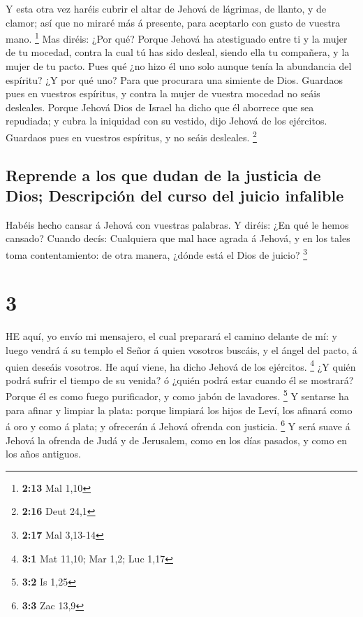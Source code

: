  Y esta otra vez haréis cubrir el altar de Jehová de
lágrimas, de llanto, y de clamor; así que no miraré más á presente, para
aceptarlo con gusto de vuestra mano. \footnote{\textbf{2:13} Mal 1,10}
 Mas diréis: ¿Por qué? Porque Jehová ha atestiguado entre
ti y la mujer de tu mocedad, contra la cual tú has sido desleal, siendo
ella tu compañera, y la mujer de tu pacto.  Pues qué ¿no
hizo él uno solo aunque tenía la abundancia del espíritu? ¿Y por qué
uno? Para que procurara una simiente de Dios. Guardaos pues en vuestros
espíritus, y contra la mujer de vuestra mocedad no seáis desleales.
 Porque Jehová Dios de Israel ha dicho que él aborrece que
sea repudiada; y cubra la iniquidad con su vestido, dijo Jehová de los
ejércitos. Guardaos pues en vuestros espíritus, y no seáis desleales.
\footnote{\textbf{2:16} Deut 24,1}

\hypertarget{reprende-a-los-que-dudan-de-la-justicia-de-dios-descripciuxf3n-del-curso-del-juicio-infalible}{%
\subsection{Reprende a los que dudan de la justicia de Dios; Descripción
del curso del juicio
infalible}\label{reprende-a-los-que-dudan-de-la-justicia-de-dios-descripciuxf3n-del-curso-del-juicio-infalible}}

 Habéis hecho cansar á Jehová con vuestras palabras. Y
diréis: ¿En qué le hemos cansado? Cuando decís: Cualquiera que mal hace
agrada á Jehová, y en los tales toma contentamiento: de otra manera,
¿dónde está el Dios de juicio? \footnote{\textbf{2:17} Mal 3,13-14}

\hypertarget{section-2}{%
\section{3}\label{section-2}}

 HE aquí, yo envío mi mensajero, el cual preparará el camino
delante de mí: y luego vendrá á su templo el Señor á quien vosotros
buscáis, y el ángel del pacto, á quien deseáis vosotros. He aquí viene,
ha dicho Jehová de los ejércitos. \footnote{\textbf{3:1} Mat 11,10; Mar
  1,2; Luc 1,17}  ¿Y quién podrá sufrir el tiempo de su
venida? ó ¿quién podrá estar cuando él se mostrará? Porque él es como
fuego purificador, y como jabón de lavadores. \footnote{\textbf{3:2} Is
  1,25}  Y sentarse ha para afinar y limpiar la plata:
porque limpiará los hijos de Leví, los afinará como á oro y como á
plata; y ofrecerán á Jehová ofrenda con justicia. \footnote{\textbf{3:3}
  Zac 13,9}  Y será suave á Jehová la ofrenda de Judá y de
Jerusalem, como en los días pasados, y como en los años antiguos.

